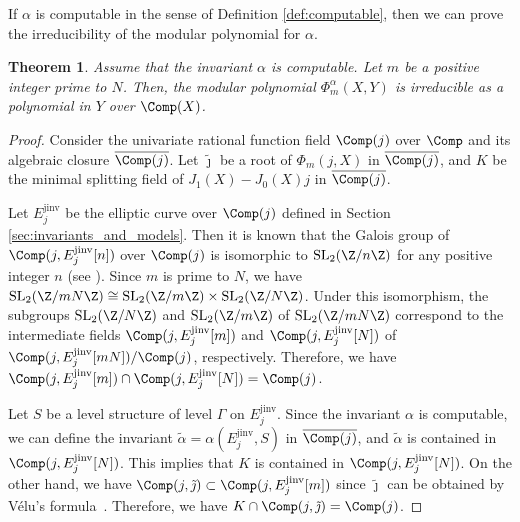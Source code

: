 \documentclass{amsart}
\newtheorem{theorem}{Theorem}[section]
\theoremstyle{definition}
\theoremstyle{remark}
\numberwithin{equation}{section}
\begin{document}
If $\alpha$ is computable in the sense of Definition \ref{def:computable},
then we can prove the irreducibility of the modular polynomial for $\alpha$.
\begin{theorem}\label{thm:irreducibility_modular_polynomial}
    Assume that the invariant $\alpha$ is computable.
    Let $m$ be a positive integer prime to $N$.
    Then, the modular polynomial $\Phi_m^\alpha(X, Y)$
    is irreducible as a polynomial in $Y$ over $\Comp(X)$.
\end{theorem}
\begin{proof}
    Consider the univariate rational function field $\Comp(j)$ over $\Comp$
    and its algebraic closure $\overline{\Comp(j)}$.
    Let $\tilde{\jmath}$ be a root of $\Phi_m(j, X)$ in $\overline{\Comp(j)}$,
    and $K$ be the minimal splitting field of $J_1(X) - J_0(X)j$ in $\overline{\Comp(j)}$.

    Let $E_j^\mathrm{jinv}$ be the elliptic curve over $\Comp(j)$
    defined in Section \ref{sec:invariants_and_models}.
    Then it is known that
    the Galois group of $\Comp(j, E_j^\mathrm{jinv}[n])$ over $\Comp(j)$
    is isomorphic to $\mathrm{SL}_2(\Z/n\Z)$ for any positive integer $n$
    (see \cite[Section 7.5]{diamond2006first}).
    Since $m$ is prime to $N$,
    we have $\mathrm{SL}_2(\Z/mN\Z) \cong \mathrm{SL}_2(\Z/m\Z) \times \mathrm{SL}_2(\Z/N\Z)$.
    Under this isomorphism,
    the subgroups $\mathrm{SL}_2(\Z/N\Z)$ and $\mathrm{SL}_2(\Z/m\Z)$ of $\mathrm{SL}_2(\Z/mN\Z)$
    correspond to
    the intermediate fields $\Comp(j, E_j^\mathrm{jinv}[m])$ and $\Comp(j, E_j^\mathrm{jinv}[N])$
    of $\Comp(j, E_j^\mathrm{jinv}[mN])/\Comp(j)$, respectively.
    Therefore, we have
    $\Comp(j, E_j^\mathrm{jinv}[m]) \cap \Comp(j, E_j^\mathrm{jinv}[N]) = \Comp(j)$.

    Let $S$ be a level structure of level $\Gamma$ on $E_j^\mathrm{jinv}$.
    Since the invariant $\alpha$ is computable,
    we can define the invariant $\tilde{\alpha} = \alpha(E_j^\mathrm{jinv}, S)$
    in $\overline{\Comp(j)}$,
    and $\tilde{\alpha}$ is contained in $\Comp(j, E_j^\mathrm{jinv}[N])$.
    This implies that $K$ is contained in $\Comp(j, E_j^\mathrm{jinv}[N])$.
    On the other hand,
    we have $\Comp(j, \tilde{\jmath}) \subset \Comp(j, E_j^\mathrm{jinv}[m])$
    since $\tilde{\jmath}$ can be obtained by V\'elu's formula~\cite{Velu1971}.
    Therefore, we have $K \cap \Comp(j, \tilde{\jmath}) = \Comp(j)$.


\end{proof}
\end{document}
